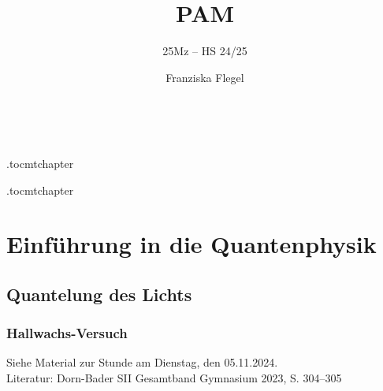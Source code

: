 \documentclass[a4paper, 10pt]{scrbook}
\title{PAM}
\subtitle{25Mz -- HS 24/25}
\author{Franziska Flegel}
\date{~}
\begin{document}
\frontmatter
\maketitle

\etocdepthtag.toc{mtchapter}
\tableofcontents

\etocdepthtag.toc{mtchapter}
\tableofcontents

\mainmatter

\chapter{Einführung in die Quantenphysik}
\section{Quantelung des Lichts}
\subsection{Hallwachs-Versuch}
Siehe Material zur Stunde am Dienstag, den 05.11.2024.\\
Literatur: Dorn-Bader SII Gesamtband Gymnasium 2023, S. 304--305 \cite{DornBader2023} 
\end{document}
